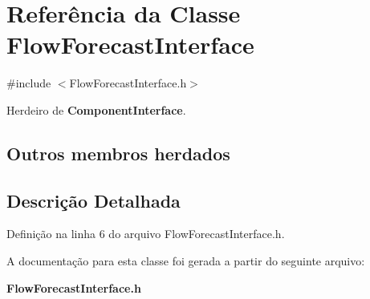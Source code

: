 \section{Referência da Classe Flow\+Forecast\+Interface}
\label{class_flow_forecast_interface}


{\ttfamily \#include $<$Flow\+Forecast\+Interface.\+h$>$}



Herdeiro de {\bf Component\+Interface}.

\subsection*{Outros membros herdados}


\subsection{Descrição Detalhada}


Definição na linha 6 do arquivo Flow\+Forecast\+Interface.\+h.



A documentação para esta classe foi gerada a partir do seguinte arquivo\+:\begin{DoxyCompactItemize}
\item 
{\bf Flow\+Forecast\+Interface.\+h}\end{DoxyCompactItemize}
